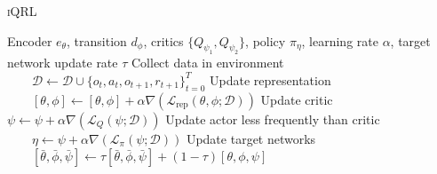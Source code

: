 \documentclass{article}
\theoremstyle{plain}
\theoremstyle{definition}
\theoremstyle{remark}
\newcommand{\our}{\textsc{iQRL}\xspace}
\begin{document}
\begin{algorithm}[tb]
   \caption{\our}
   \label{alg:main_alg}
   \renewcommand{\algorithmiccomment}[1]{\hfill\textcolor{gray}{\(\triangleright\) #1}}
\begin{algorithmic}
    Encoder $e_{\theta}$, transition $d_{\phi}$, critics $\{Q_{\psi_{1}}, Q_{\psi_{2}} \}$, policy $\pi_{\eta}$, learning rate $\alpha$, target network update rate $\tau$
    \STATE Collect data in environment
    \STATE $\qquad \mathcal{D} \leftarrow \mathcal{D} \cup \{o_{t}, a_{t}, o_{t+1}, r_{t+1}\}^{T}_{t=0}$
        \STATE Update representation
        \STATE $\qquad [\theta, \phi] \leftarrow [\theta, \phi] + \alpha \nabla \left( \mathcal{L}_{\text{rep}}(\theta, \phi; \mathcal{D}) \right)$  
        \STATE Update critic
        \STATE \quad \quad $\psi \leftarrow \psi + \alpha \nabla \left( \mathcal{L}_{Q}(\psi; \mathcal{D}) \right)$ 
          \STATE Update actor less frequently than critic
          \STATE $\quad \quad \eta \leftarrow \psi + \alpha \nabla \left( \mathcal{L}_{\pi}(\psi; \mathcal{D}) \right)$  
        \ENDIF
        \STATE Update target networks
        \STATE $\quad \quad [\bar{\theta}, \bar{\phi}, \bar{\psi}] \leftarrow \tau [\bar{\theta}, \bar{\phi}, \bar{\psi}] + (1-\tau) [{\theta}, {\phi}, {\psi}]$
    \ENDFOR
   \ENDFOR
\end{algorithmic}
\end{algorithm}
\end{document}
